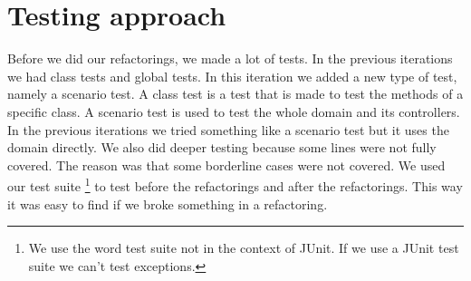 \section{Testing approach}
Before we did our refactorings, we made a lot of tests. In the previous iterations we had class tests and global tests. In this iteration we added a new type of test, namely a scenario test. A class test is a test that is made to test the methods of a specific class. A scenario test is used to test the whole domain and its controllers. In the previous iterations we tried something like a scenario test but it uses the domain directly. We also did deeper testing because some lines were not fully covered. The reason was that some borderline cases were not covered. We used our test suite \footnote{We use the word test suite not in the context of JUnit. If we use a JUnit test suite we can't test exceptions.} to test before the refactorings and after the refactorings. This way it was easy to find if we broke something in a refactoring.
